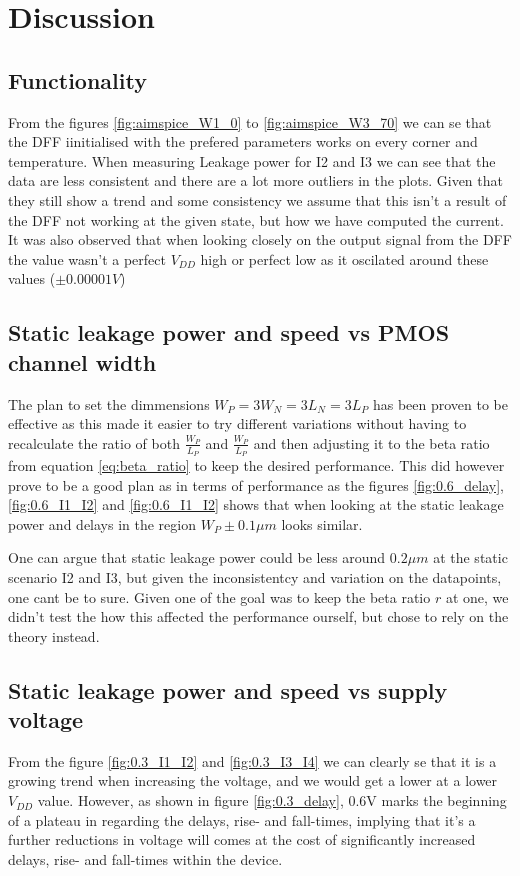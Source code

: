 \section{Discussion}

\subsection{Functionality}
From the figures \ref{fig:aimspice_W1_0} to \ref{fig:aimspice_W3_70} we can se that the DFF iinitialised with the prefered parameters works on every corner and temperature. When measuring Leakage power for I2 and I3 we can see that the data are less consistent and there are a lot more outliers in the plots. Given that they still show a trend and some consistency we assume that this isn't a result of the DFF not working at the given state, but how we have computed the current. It was also observed that when looking closely on the output signal from the DFF the value wasn't a perfect $V_{DD}$ high or perfect low as it oscilated around these values ($\pm0.00001V$) 

\subsection{Static leakage power and speed vs PMOS channel width}
The plan to set the dimmensions $W_P=3W_N=3L_N=3L_P$ has been proven to be effective as this made it easier to try different variations without having to recalculate the ratio of both $\frac{W_P}{L_P}$ and $\frac{W_P}{L_P}$ and then adjusting it to the beta ratio from equation \ref{eq:beta_ratio} to keep the desired performance. This did however prove to be a good plan as in terms of performance as the figures \ref{fig:0.6_delay}, \ref{fig:0.6_I1_I2} and \ref{fig:0.6_I1_I2} shows that when looking at the static leakage power and delays in the region $W_P \pm 0.1\mu m$ looks similar.

 One can argue that static leakage power could be less around $0.2\mu m$ at the static scenario I2 and I3, but given the inconsistentcy and variation on the datapoints, one cant be to sure. Given one of the goal was to keep the beta ratio $r$ at one, we didn't test the how this affected the performance ourself, but chose to rely on the theory instead.

 \subsection{Static leakage power and speed vs supply voltage}
 From the figure \ref{fig:0.3_I1_I2} and \ref{fig:0.3_I3_I4} we can clearly se that it is a growing trend when increasing the voltage, and we would get a lower at a lower $V_{DD}$ value. However, as shown in figure \ref{fig:0.3_delay}, 0.6V marks the beginning of a plateau in regarding the delays, rise- and fall-times, implying that it's a further reductions in voltage will comes at the cost of significantly increased delays, rise- and fall-times within the device.

 